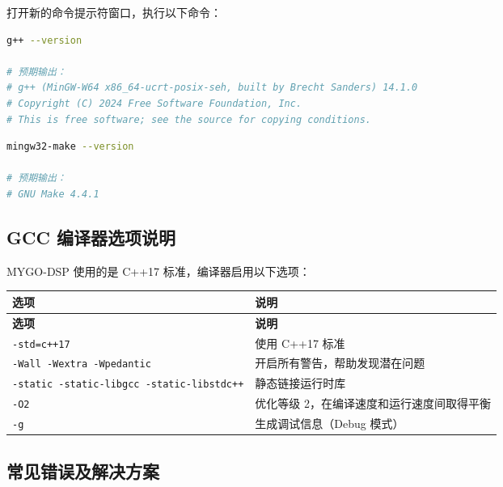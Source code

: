﻿\documentclass[12pt,a4paper,oneside]{ctexbook}
\begin{document}
打开新的命令提示符窗口，执行以下命令：

\begin{lstlisting}[language=bash, caption={验证 MinGW 安装}]
g++ --version

# 预期输出：
# g++ (MinGW-W64 x86_64-ucrt-posix-seh, built by Brecht Sanders) 14.1.0
# Copyright (C) 2024 Free Software Foundation, Inc.
# This is free software; see the source for copying conditions.
\end{lstlisting}

\begin{lstlisting}[language=bash, caption={验证 Mingw32-make}]
mingw32-make --version

# 预期输出：
# GNU Make 4.4.1
\end{lstlisting}

\subsection{GCC 编译器选项说明}

MYGO-DSP 使用的是 C++17 标准，编译器启用以下选项：

\begin{longtable}{p{4cm}p{9cm}}
    \toprule
    \textbf{选项} & \textbf{说明} \\
    \midrule
    \endfirsthead
    \toprule
    \textbf{选项} & \textbf{说明} \\
    \midrule
    \endhead
    \bottomrule
    \endfoot
    \texttt{-std=c++17} & 使用 C++17 标准 \\
    \texttt{-Wall -Wextra -Wpedantic} & 开启所有警告，帮助发现潜在问题 \\
    \texttt{-static -static-libgcc -static-libstdc++} & 静态链接运行时库 \\
    \texttt{-O2} & 优化等级 2，在编译速度和运行速度间取得平衡 \\
    \texttt{-g} & 生成调试信息（Debug 模式） \\
    \bottomrule
\end{longtable}

\subsection{常见错误及解决方案}
\end{document}
